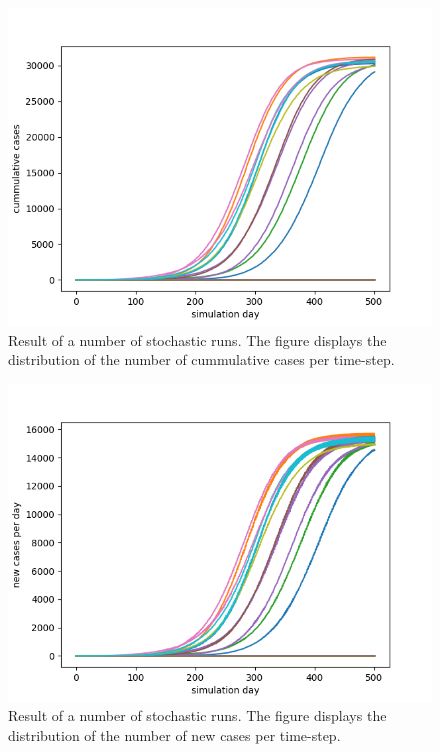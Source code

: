 \documentclass[runningheads]{llncs}
\begin{document}
\begin{figure}
	\includegraphics[width=\textwidth]{fig1.png}
	\caption{Result of a number of stochastic runs. The figure displays the distribution of the number of cummulative cases per time-step.} 	
	\label{fig1}
\end{figure}

\begin{figure}
	\includegraphics[width=\textwidth]{fig2.png}
	\caption{Result of a number of stochastic runs. The figure displays the distribution of the number of new cases per time-step.} 
	\label{fig2}
\end{figure}
\end{document}
